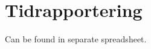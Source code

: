 \documentclass[12pt,a4paper]{article}
\begin{document}


\section{Tidrapportering}

Can be found in separate spreadsheet.

\end{document}
